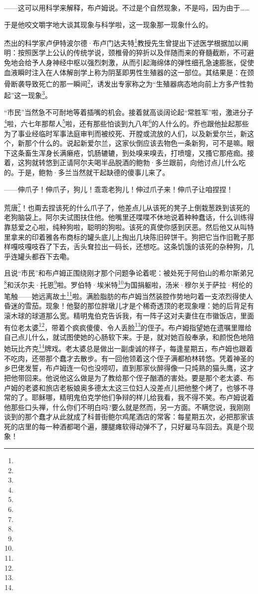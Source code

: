 \par ——这可以用科学来解释，布卢姆说。不过是个自然现象，不是吗，因为由于……
\par 于是他咬文嚼字地大谈其现象与科学啦，这一现象那一现象什么的。
\par 杰出的科学家卢伊特波尔德·布卢门达夫特\footnote{}教授先生曾提出下述医学根据加以阐明：按照医学上公认的传统学说，颈椎骨的猝折以及伴随而来的脊髓截断，不可避免地会给予人身神经中枢以强烈刺激，从而引起海绵体的弹性细孔急速膨胀，促使血液瞬时注入在人体解剖学上称为阴茎即男性生殖器的这一部位。其结果是：在颈骨断袭导致死亡的那一瞬间\footnote{}，诱发出专家称之为“生殖器病态地向前上方多产性勃起”这一现象\footnote{}。
\par “市民”当然急不可耐地等着插嘴的机会。接着就高谈阔论起“常胜军”啦，激进分子\footnote{}啦，六七年那帮人\footnote{}啦，还有那些怕谈到九八年\footnote{}的人什么的。乔也跟他扯起那些为了事业经临时军事法庭审判而被绞死、开膛或流放的人们，以及新爱尔兰，新这个，新那个什么的。说起新爱尔兰，这家伙倒应该去物色一条新狗，可不是嘛。眼下这条畜生浑身长满癞疮，饥肠辘辘，到处嗅来嗅去，打喷嚏，又搔它那疮痂。接着，这狗就转悠到正请阿尔夫喝半品脱酒的鲍勃·多兰跟前，向他讨点儿什么吃的。于是，鲍勃·多兰当然就干起缺德的傻事儿来了。
\par ——伸爪子！伸爪子，狗儿！乖乖老狗儿！伸过爪子来！伸爪子让咱捏捏！
\par 荒唐\footnote{}！也甭去捏该死的什么爪子了，他差点儿从该死的凳子上倒栽葱跌到该死的老狗脑袋上。阿尔夫试图扶住他。他嘴里还喋喋不休地说着种种蠢话，什么训练得靠慈爱之心啦，纯种狗啦，聪明的狗啦。该死的真使你感到厌恶。然后他又从叫特里拿来的印着雅各布商标的罐头底儿上掏出几块陈旧碎饼干。狗把它当作旧靴子那样嘎吱嘎吱吞了下去，舌头耷拉出一码长，还想吃。这条饥饿的该死的杂种狗，几乎连罐头都吞下去嘞。
\par 且说“市民”和布卢姆正围绕刚才那个问题争论着呢：被处死于阿伯山的希尔斯弟兄\footnote{}和沃尔夫·托恩\footnote{}啦。罗伯特·埃米特\footnote{}为国捐躯啦，汤米·穆尔关于萨拉·柯伦的笔触——她远离故土\footnote{}啦。满脸脂肪的布卢姆当然装腔作势地叼着一支浓烈得使人昏迷的雪茄。现象！他娶的那位胖墩儿才是个稀奇透顶的老现象哩：她的后背足有滚木球的球道那么宽。精明鬼伯克告诉我，有一阵子这对夫妻住在市徽饭店，里面有位老太婆\footnote{}，带着个疯疯傻傻、令人丢脸\footnote{}的侄子。布卢姆指望她在遗嘱里赠给自己点儿什么，就试图使她的心肠软下来。于是，就对她百般奉承，和颜悦色地陪她玩比齐克\footnote{}牌戏。老太婆总是做出一副虔诚的样子，每逢星期五，布卢姆也跟着不吃肉，还带那个蠢才去散步。有一回他领着这个侄子满都柏林转悠。凭着神圣的乡巴佬发誓，布卢姆连一句也没唠叨，直到那家伙醉得像一只炖熟的猫头鹰，这才把他带回来。他说他这么做是为了教给那个侄子酗酒的害处。要是那个老太婆、布卢姆的老婆和旅店老板娘奥多德太太这三位妇人没差点儿把他整个烤了，也够不寻常的了。耶稣哪，精明鬼伯克学他们争辩的样儿给我看，我不得不笑。布卢姆说着他那些口头禅，什么你们不明白吗?要么就是然而，另一方面。不瞒您说，我刚刚谈到的那个蠢才从此就成了科普街鲍尔鸡尾酒店的常客：每星期五次，必把那家该死的店里的每一种酒都喝个遍，腰腿瘫软得动弹不了，只好雇马车回去。真是个现象！
